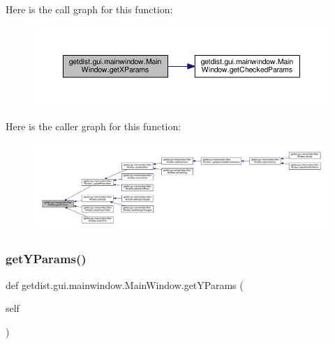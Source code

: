 Here is the call graph for this function\+:
\nopagebreak
\begin{figure}[H]
\begin{center}
\leavevmode
\includegraphics[width=350pt]{classgetdist_1_1gui_1_1mainwindow_1_1MainWindow_a9f988a9217e030de892f370248a94481_cgraph}
\end{center}
\end{figure}
Here is the caller graph for this function\+:
\nopagebreak
\begin{figure}[H]
\begin{center}
\leavevmode
\includegraphics[width=350pt]{classgetdist_1_1gui_1_1mainwindow_1_1MainWindow_a9f988a9217e030de892f370248a94481_icgraph}
\end{center}
\end{figure}
\mbox{\label{classgetdist_1_1gui_1_1mainwindow_1_1MainWindow_a5a49bcf9798a91781b81e59086d05e61}} 
\subsubsection{\texorpdfstring{get\+Y\+Params()}{getYParams()}}
{\footnotesize\ttfamily def getdist.\+gui.\+mainwindow.\+Main\+Window.\+get\+Y\+Params (\begin{DoxyParamCaption}\item[{}]{self }\end{DoxyParamCaption})}



